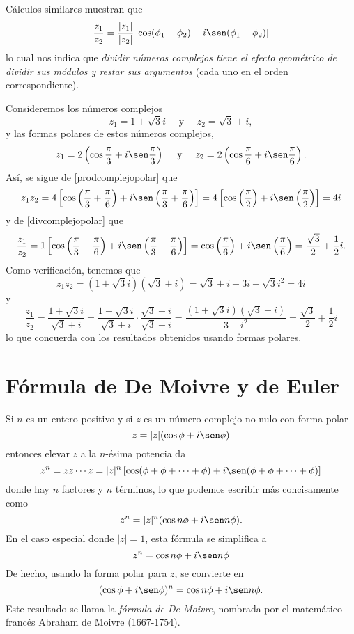 Cálculos similares muestran que
\begin{equation}
    \frac{z_1}{z_2} = \frac{|z_1|}{|z_2|} \left[ \cos(\phi_1 - \phi_2) + i \sen(\phi_1 - \phi_2) \right] \label{divcomplejopolar}
\end{equation}
lo cual nos indica que \emph{dividir números complejos tiene el efecto geométrico de dividir sus módulos y restar sus argumentos} (cada uno en el orden correspondiente).

\begin{examplebox}{}{}
    Consideremos los números complejos
    $$z_1 = 1 + \sqrt{3}i \quad \text{ y } \quad z_2 = \sqrt{3} + i,$$
    y las formas polares de estos números complejos,
    $$z_1 = 2 \left( \cos \frac{\pi}{3} + i \sen \frac{\pi}{3} \right) \quad \text{ y } \quad z_2 = 2 \left( \cos \frac{\pi}{6} + i \sen \frac{\pi}{6} \right).$$
    Así, se sigue de \eqref{prodcomplejopolar} que
    $$z_1 z_2 = 4 \left[ \cos \left( \frac{\pi}{3} + \frac{\pi}{6} \right) + i \sen \left( \frac{\pi}{3} + \frac{\pi}{6} \right) \right] = 4 \left[ \cos \left( \frac{\pi}{2} \right) + i \sen \left( \frac{\pi}{2} \right) \right] = 4i$$
    y de \eqref{divcomplejopolar} que
    $$\frac{z_1}{z_2} = 1 \left[ \cos \left( \frac{\pi}{3} - \frac{\pi}{6} \right) + i \sen \left( \frac{\pi}{3} - \frac{\pi}{6} \right) \right] = \cos \left( \frac{\pi}{6} \right) + i \sen \left( \frac{\pi}{6} \right) = \frac{\sqrt{3}}{2} + \frac{1}{2}i.$$
    \newpage
    Como verificación, tenemos que
    $$z_1 z_2 = \left(1 + \sqrt{3}i\right)\left(\sqrt{3} + i\right) = \sqrt{3} + i + 3i + \sqrt{3}i^2 = 4i$$
    y
    $$\frac{z_1}{z_2} = \frac{1 + \sqrt{3}i}{\sqrt{3} + i} = \frac{1 + \sqrt{3}i}{\sqrt{3} + i} \cdot \frac{\sqrt{3} - i}{\sqrt{3} - i} = \frac{\left(1 + \sqrt{3}i\right)\left(\sqrt{3} - i\right)}{3 - i^2} = \frac{\sqrt{3}}{2} + \frac{1}{2}i$$
    lo que concuerda con los resultados obtenidos usando formas polares.
\end{examplebox}

\section{Fórmula de De Moivre y de Euler}

Si $n$ es un entero positivo y si $z$ es un número complejo no nulo con forma polar
$$z = |z| (\cos \phi + i \sen \phi)$$
entonces elevar $z$ a la $n$-ésima potencia da
$$z^n = z z \cdots z = |z|^n \left[ \cos (\phi + \phi + \cdots + \phi) + i \sen (\phi + \phi + \cdots + \phi) \right]$$
donde hay $n$ factores y $n$ términos, lo que podemos escribir más concisamente como
$$z^n = |z|^n (\cos n\phi + i \sen n\phi).$$
En el caso especial donde $|z| = 1$, esta fórmula se simplifica a
$$z^n = \cos n\phi + i \sen n\phi$$
De hecho, usando la forma polar para $z$, se convierte en
\begin{equation}
    (\cos \phi + i \sen \phi)^n = \cos n\phi + i \sen n\phi. \label{formuladedemoivre}
\end{equation}
Este resultado se llama la \emph{fórmula de De Moivre}, nombrada por el matemático francés Abraham de Moivre (1667-1754).


